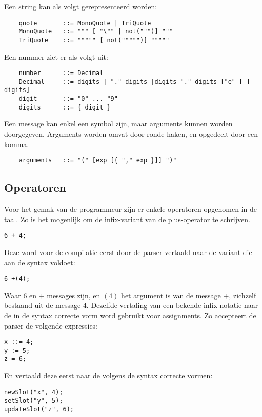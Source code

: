 \documentclass[12pt]{article}
\begin{document}
Een string kan als volgt gerepresenteerd worden:
\begin{lstlisting}
	quote 		::= MonoQuote | TriQuote
	MonoQuote 	::= """ [ "\"" | not(""")] """
	TriQuote 	::= """"" [ not(""""")] """""
\end{lstlisting}
Een nummer ziet er als volgt uit:
\begin{lstlisting}
	number    	::= Decimal
	Decimal  	::= digits | "." digits |digits "." digits ["e" [-] digits]
	digit 		::= "0" ... "9"
	digits 		::= { digit }
\end{lstlisting}

Een message kan enkel een symbol zijn, maar arguments kunnen worden doorgegeven. Arguments worden omvat door ronde haken, en opgedeelt door een komma.
\begin{lstlisting}
	arguments 	::= "(" [exp [{ "," exp }]] ")"
\end{lstlisting}
\subsection{Operatoren}
Voor het gemak van de programmeur zijn er enkele operatoren opgenomen in de taal. Zo is het mogenlijk om de infix-variant van de plus-operator te schrijven.
\begin{lstlisting}[frame=single]
6 + 4;
\end{lstlisting}
Deze word voor de compilatie eerst door de parser vertaald naar de variant die aan de syntax voldoet:
\begin{lstlisting}[frame=single]
6 +(4);
\end{lstlisting}
Waar \(6\) en \(+\) messages zijn, en \( (4) \) het argument is van de message \(+\), zichzelf bestaand uit de message \(4\). Dezelfde vertaling van een bekende infix notatie naar de in de syntax correcte vorm word gebruikt voor assignments. Zo accepteert de parser de volgende expressies:
\begin{lstlisting}[frame=single]
x ::= 4;
y := 5;
z = 6;
\end{lstlisting}
En vertaald deze eerst naar de volgens de syntax correcte vormen:
\begin{lstlisting}[frame=single]
newSlot("x", 4);
setSlot("y", 5);
updateSlot("z", 6);
\end{lstlisting}
\end{document}
